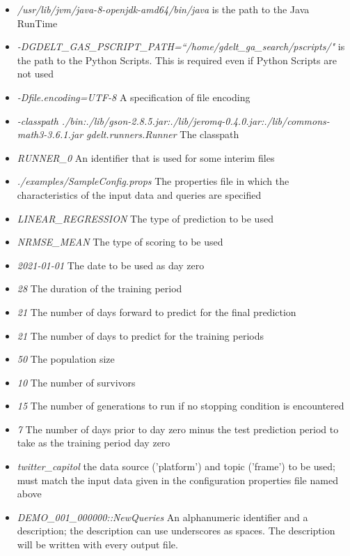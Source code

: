\begin{itemize}
\item \textit{ /usr/lib/jvm/java-8-openjdk-amd64/bin/java}  is the path to the Java RunTime
\item \textit{ -DGDELT\_GAS\_PSCRIPT\_PATH=``/home/gdelt\_ga\_search/pscripts/"}  is the path to the Python Scripts. This is required even if Python Scripts are not used
\item \textit{-Dfile.encoding=UTF-8} A specification of file encoding
\item \textit{-classpath ./bin:./lib/gson-2.8.5.jar:./lib/jeromq-0.4.0.jar:./lib/commons-math3-3.6.1.jar gdelt.runners.Runner} The classpath
\item \textit{RUNNER\_0} An identifier that is used for some interim files
\item \textit{./examples/SampleConfig.props} The properties file in which the characteristics of the input data and queries are specified
\item \textit{LINEAR\_REGRESSION} The type of prediction to be used
\item \textit{NRMSE\_MEAN} The type of scoring to be used
\item \textit{2021-01-01} The date to be used as day zero
\item \textit{28} The duration of the training period
\item \textit{21} The number of days forward to predict for the final prediction
\item \textit{21} The number of days to predict for the training periods
\item \textit{50 }The population size
\item \textit{10} The number of survivors
\item \textit{15} The number of generations to run if no stopping condition is encountered
\item \textit{7} The number of days prior to day zero minus the test prediction period to take as the training period day zero
\item \textit{twitter\_capitol} the data source ('platform') and topic ('frame') to be used; must match the input data given in the configuration properties file named above 
\item \textit{DEMO\_001\_000000::NewQueries} An alphanumeric identifier and a description; the description can use underscores as spaces. The description will be written with every output file.
\end{itemize}

